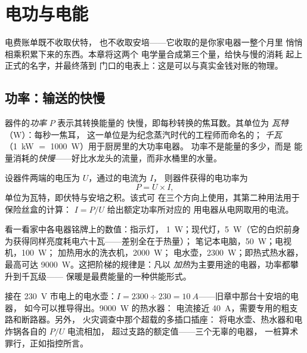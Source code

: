 \chapter{电功与电能}\label{ch:g9:electric-power-energy}

电费账单既不收取伏特，
也不收取安培——它收取的是你家电器一整个月里
悄悄相乘积累下来的东西。本章将这两个
电学量合成第三个量，给快与慢的消耗
起上正式的名字，并最终落到
门口的电表上：这是可以与真实金钱对账的物理。

\section{功率：输送的快慢}

\begin{definition}[功率与瓦特]\label{def:g9:electric-power-energy:power}
器件的\emph{功率} $P$ 表示其转换能量的
快慢，即每秒转换的焦耳数。其单位为
\emph{瓦特}（\unit{W}）：每秒一焦耳，
这一单位是为纪念蒸汽时代的工程师而命名的；
\emph{千瓦}（\qty{1}{kW} $=$ \qty{1000}{W}）用于厨房里的大功率电器。
功率不是能量的多少，而是
能量消耗的\emph{快慢}——好比水龙头的流量，而非水桶里的水量。
%
\end{definition}

\begin{proposition}[电功率]\label{prop:g9:electric-power-energy:UI}
设器件两端的电压为 $U$，通过的电流为 $I$，
则器件获得的电功率为
\[
P = U \times I ,
\]
单位为瓦特，即伏特与安培之积。该式可
在三个方向上使用，其第二种用法用于保险丝盒的计算：
$I = P/U$ 给出额定功率所对应的
用电器从电网取用的电流。
\end{proposition}

\begin{example}[家用电器的功率阶梯]\label{ex:g9:electric-power-energy:ladder}
看一看家中各电器铭牌上的数值：指示灯，
\qty{1}{W}；现代灯，\qty{5}{W}（它的白炽前身
为获得同样亮度耗电六十瓦——差别全在于热量）；
笔记本电脑，\qty{50}{W}；电视机，\qty{100}{W}；
加热用水的洗衣机，\qty{2000}{W}；
电水壶，\qty{2300}{W}；即热式热水器，最高可达
\qty{9000}{W}。这把阶梯的规律是：凡以
\emph{加热}为主要用途的电器，功率都攀升到千瓦级——
保暖是最费能量的一种供能形式。
\end{example}

\begin{example}[保险丝盒的计算]\label{ex:g9:electric-power-energy:fuses}
接在 \qty{230}{V} 市电上的电水壶：$I = 2300 \div 230 =
\qty{10}{A}$——旧章中那台十安培的电器，
如今可以推导得出。\qty{9000}{W} 的热水器：
电流接近 \qty{40}{A}，需要专用的粗支路和断路器。另外，
火灾调查中那个超载的多插口插座：
将电水壶、热水器和电炸锅各自的 $P/U$ 电流相加，
超过支路的额定值——三个无辜的电器，
一桩算术罪行，正如指控所言。
\end{example}

